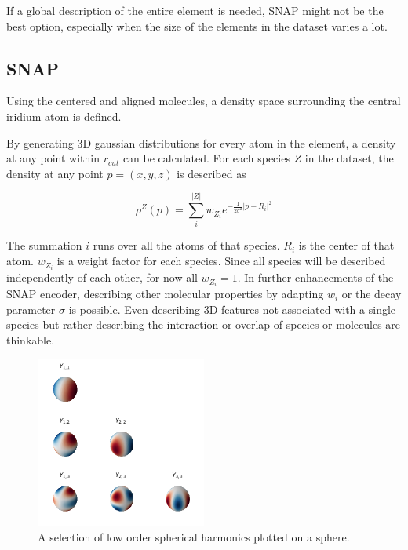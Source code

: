 If a global description of the entire element is needed, SNAP might not be the best option, especially when 
the size of the elements in the dataset varies a lot.

\subsection{SNAP}

Using the centered and aligned molecules, a density space surrounding the central iridium atom is defined.

By generating 3D gaussian distributions for every atom in the element, a density at any point within $r_{cut}$ can be calculated.
For each species $Z$ in the dataset, the density at any point $p = (x,y,z)$ is described as

$$\rho^Z(p) = \sum_i^{|Z|} w_{Z_i} e^{- \frac{1}{2\sigma^2} \vert p - R_i \vert^2 }$$  %

The summation $i$ runs over all the atoms of that species.
$R_i$ is the center of that atom.
$w_{Z_i}$ is a weight factor for each species. 
Since all species will be described independently of each other, for now all $w_{Z_i}=1$.
In further enhancements of the SNAP encoder, describing other molecular properties by adapting $w_{i}$ or the decay parameter $\sigma$ is possible.
Even describing 3D features not associated with a single species but rather describing the interaction or overlap of species 
or molecules are thinkable.

\begin{figure} [H]
  \centering
  \includegraphics[width=0.5\textwidth]{figures/snap/sph-harm.png} %
  \caption[Spherical harmonics]{A selection of low order spherical harmonics plotted on a sphere. } %
  \label{fig:sphharm}
\end{figure}

